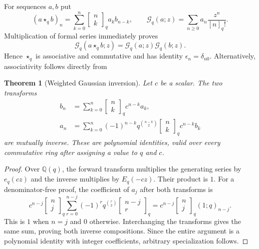 \documentclass[11pt,a4paper,oneside,openany]{book}
\newtheorem{theorem}{Theorem}[chapter]
\theoremstyle{definition}
\theoremstyle{remark}
\newcommand{\Q}{\mathbb Q}
\newcommand{\GB}[3][q]{\begin{bmatrix}#2\\#3\end{bmatrix}_{#1}}
\newcommand{\qf}[2][q]{[#2]_{#1}!}
\newcommand{\qb}[2]{\GB{#1}{#2}}
\newcommand{\poch}[3]{(#1;#2)_{#3}}
\begin{document}
For sequences $a,b$ put
\begin{equation}\label{q2:eq:qconv}
 (a\star_q b)_n=\sum_{k=0}^n\qb nk a_kb_{n-k},\qquad
 \mathscr G_q(a;z)=\sum_{n\ge0}a_n\frac{z^n}{\qf n}.
\end{equation}
Multiplication of formal series immediately proves
\begin{equation}\label{q2:eq:qconv-series}
 \mathscr G_q(a\star_q b;z)=\mathscr G_q(a;z)\mathscr G_q(b;z).
\end{equation}
Hence $\star_q$ is associative and commutative and has identity
$\epsilon_n=\delta_{n0}$. Alternatively, associativity follows directly from
\begin{theorem}[Weighted Gaussian inversion]\label{q2:thm:transform}
Let $c$ be a scalar. The two transforms
\begin{align}
 b_n&=\sum_{k=0}^n\qb nk c^{n-k}a_k,\label{q2:eq:transform-forward}\\
 a_n&=\sum_{k=0}^n(-1)^{n-k}q^{\binom{n-k}2}\qb nk c^{n-k}b_k
 \label{q2:eq:transform-inverse}
\end{align}
are mutually inverse. These are polynomial identities, valid over every
commutative ring after assigning a value to $q$ and $c$.
\end{theorem}
\begin{proof}
Over $\Q(q)$, the forward transform multiplies the generating series by
$e_q(cz)$ and the inverse multiplies by $E_q(-cz)$. Their product is $1$.
For a denominator-free proof, the coefficient of $a_j$ after both transforms is
\[
 c^{n-j}\qb nj
 \sum_{r=0}^{n-j}(-1)^r q^{\binom r2}\qb{n-j}r
 =c^{n-j}\qb nj\poch1q{n-j}.
\]
This is $1$ when $n=j$ and $0$ otherwise. Interchanging the transforms gives the
same sum, proving both inverse compositions. Since the entire argument is a
polynomial identity with integer coefficients, arbitrary specialization follows.
\end{proof}
\end{document}
